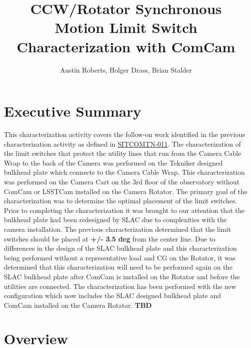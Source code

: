 \documentclass[SE,lsstdraft,authoryear,toc]{lsstdoc}
\title{CCW/Rotator Synchronous Motion Limit Switch Characterization with ComCam}
\author{%
Austin Roberts, Holger Drass, Brian Stalder
}
\date{\vcsDate}
\begin{document}
\maketitle

\section{Executive Summary}

This characterization activity covers the follow-on work identified in the previous characterization activity as defined in \href{https://sitcomtn-011.lsst.io/}{SITCOMTN-011}. The characterization of the limit switches that protect the utility lines that run from the Camera Cable Wrap to the back of the Camera was performed on the Tekniker designed bulkhead plate which connects to the Camera Cable Wrap. This characterization was performed on the Camera Cart on the 3rd floor of the observatory without ComCam or LSSTCam installed on the Camera Rotator. The primary goal of the characterization was to determine the optimal placement of the limit switches. Prior to completing the characterization it was brought to our attention that the bulkhead plate had been redesigned by SLAC due to complexities with the camera installation. The previous characterization determined that the limit switches should be placed at \textbf{+/- 3.5 deg} from the center line. Due to differences in the design of the SLAC bulkhead plate and this characterization being performed without a representative load and CG on the Rotator, it was determined that this characterization will need to be performed again on the SLAC bulkhead plate after ComCam is installed on the Rotator and before the utilities are connected.
The characterization has been performed with the new configuration which now includes the SLAC designed bulkhead plate and ComCam installed on the Camera Rotator.
{\color{red}
\textbf{TBD}}


\section{Overview}
\end{document}
